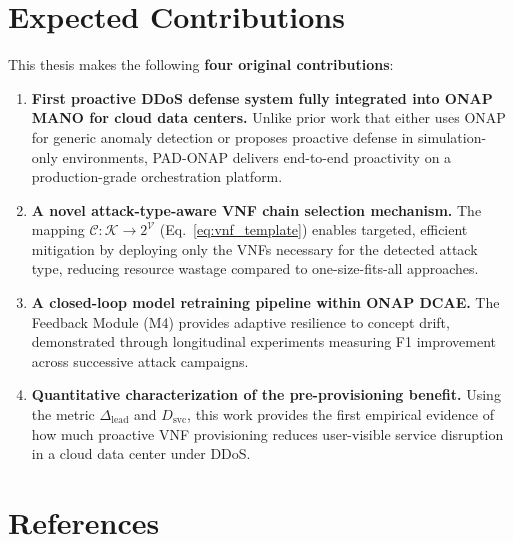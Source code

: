 \documentclass[12pt, a4paper]{article}
\begin{document}
\section{Expected Contributions}

This thesis makes the following \textbf{four original contributions}:

\begin{enumerate}[label=\textbf{C\arabic*.}, leftmargin=1.5cm]

\item \textbf{First proactive DDoS defense system fully integrated into ONAP
MANO for cloud data centers.} Unlike prior work that either uses ONAP for
generic anomaly detection or proposes proactive defense in simulation-only
environments, PAD-ONAP delivers end-to-end proactivity on a production-grade
orchestration platform.

\item \textbf{A novel attack-type-aware VNF chain selection mechanism.}
The mapping $\mathcal{C}: \mathcal{K} \to 2^{\mathcal{V}}$
(Eq.~\eqref{eq:vnf_template}) enables targeted, efficient mitigation
by deploying only the VNFs necessary for the detected attack type,
reducing resource wastage compared to one-size-fits-all approaches.

\item \textbf{A closed-loop model retraining pipeline within ONAP DCAE.}
The Feedback Module (M4) provides adaptive resilience to concept drift,
demonstrated through longitudinal experiments measuring F1 improvement
across successive attack campaigns.

\item \textbf{Quantitative characterization of the pre-provisioning benefit.}
Using the metric $\Delta_{\mathrm{lead}}$ and $D_{\mathrm{svc}}$, this work
provides the first empirical evidence of how much proactive VNF provisioning
reduces user-visible service disruption in a cloud data center under DDoS.

\end{enumerate}

\section*{References}
\end{document}
